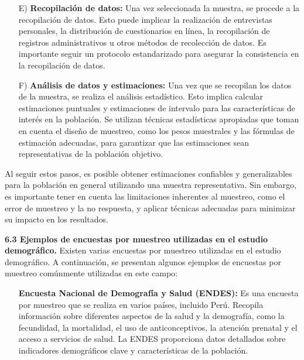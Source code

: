 \documentclass[8pt,a4paper]{beamer}
\begin{document}
{\begin{frame}{}
\begin{block}{}
\begin{enumerate}
\item[E)] \textbf{Recopilación de datos:} Una vez seleccionada la muestra, se procede a la recopilación de datos. Esto puede implicar la realización de entrevistas personales, la distribución de cuestionarios en línea, la recopilación de registros administrativos u otros métodos de recolección de datos. Es importante seguir un protocolo estandarizado para asegurar la consistencia en la recopilación de datos.
\end{enumerate}
\end{block}
\end{frame}


\begin{frame}{}
\begin{block}{}
\justifying
\begin{enumerate}
\justifying
\item[F)] \textbf{Análisis de datos y estimaciones:} Una vez que se recopilan los datos de la muestra, se realiza el análisis estadístico. Esto implica calcular estimaciones puntuales y estimaciones de intervalo para las características de interés en la población. Se utilizan técnicas estadísticas apropiadas que toman en cuenta el diseño de muestreo, como los pesos muestrales y las fórmulas de estimación adecuadas, para garantizar que las estimaciones sean representativas de la población objetivo.
\end{enumerate}
Al seguir estos pasos, es posible obtener estimaciones confiables y generalizables para la población en general utilizando una muestra representativa. Sin embargo, es importante tener en cuenta las limitaciones inherentes al muestreo, como el error de muestreo y la no respuesta, y aplicar técnicas adecuadas para minimizar su impacto en los resultados.
\end{block}
\end{frame}


\begin{frame}{}
\begin{block}{\textbf{6.3 Ejemplos de encuestas por muestreo utilizadas en el estudio demográfico.}}
\justifying
Existen varias encuestas por muestreo utilizadas en el estudio demográfico. A continuación, se presentan algunos ejemplos de encuestas por muestreo comúnmente utilizadas en este campo:
\begin{enumerate}
\justifying
\item[\ding{79}] \textbf{Encuesta Nacional de Demografía y Salud (ENDES):} Es una encuesta por muestreo que se realiza en varios países, incluido Perú. Recopila información sobre diferentes aspectos de la salud y la demografía, como la fecundidad, la mortalidad, el uso de anticonceptivos, la atención prenatal y el acceso a servicios de salud. La ENDES proporciona datos detallados sobre indicadores demográficos clave y características de la población.


\end{enumerate}
\end{block}
\end{frame}}
\end{document}
